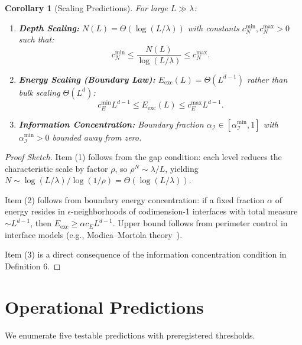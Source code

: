 \documentclass{article}
\newtheorem{corollary}{Corollary}
\begin{document}
\begin{corollary}[Scaling Predictions]
\label{cor:scaling}
For large $L \gg \lambda$:
\begin{enumerate}[noitemsep]
\item \textbf{Depth Scaling:} $N(L) = \Theta(\log(L/\lambda))$ with constants $c_N^{\min}, c_N^{\max} > 0$ such that:
\begin{equation}
c_N^{\min} \leq \frac{N(L)}{\log(L/\lambda)} \leq c_N^{\max}.
\end{equation}
\item \textbf{Energy Scaling (Boundary Law):} $E_{\text{exc}}(L) = \Theta(L^{d-1})$ rather than bulk scaling $\Theta(L^d)$:
\begin{equation}
c_E^{\min} L^{d-1} \leq E_{\text{exc}}(L) \leq c_E^{\max} L^{d-1}.
\end{equation}
\item \textbf{Information Concentration:} Boundary fraction $\alpha_{\mathcal{I}} \in [\alpha_{\mathcal{I}}^{\min}, 1]$ with $\alpha_{\mathcal{I}}^{\min} > 0$ bounded away from zero.
\end{enumerate}
\end{corollary}

\begin{proof}[Proof Sketch]
Item (1) follows from the gap condition: each level reduces the characteristic scale by factor $\rho$, so $\rho^N \sim \lambda/L$, yielding $N \sim \log(L/\lambda)/\log(1/\rho) = \Theta(\log(L/\lambda))$.

Item (2) follows from boundary energy concentration: if a fixed fraction $\alpha$ of energy resides in $\epsilon$-neighborhoods of codimension-1 interfaces with total measure $\sim L^{d-1}$, then $E_{\text{exc}} \geq \alpha c_E L^{d-1}$. Upper bound follows from perimeter control in interface models (e.g., Modica--Mortola theory~\cite{modica1977gradient}).

Item (3) is a direct consequence of the information concentration condition in Definition 6.
\end{proof}

\section{Operational Predictions}
\label{sec:predictions}

We enumerate five testable predictions with preregistered thresholds.
\end{document}
